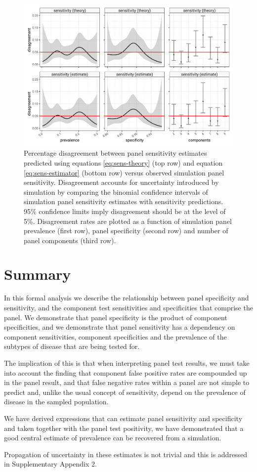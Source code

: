 \documentclass[a4paper, 12pt, twoside]{article}
\let\Oldsection\section
\renewcommand{\section}{\FloatBarrier\Oldsection}
\begin{document}
\begin{figure}[h!]
\centering
  \includegraphics{fig/calibration-prediction-v-simulation.png}
  \caption{Percentage disagreement between panel sensitivity estimates predicted using equations \eqref{eq:sens-theory} (top row) and equation \eqref{eq:sens-estimator} (bottom row) versus observed simulation panel sensitivity. Disagreement accounts for uncertainty introduced by simulation by comparing the binomial confidence intervals of simulation panel sensitivity estimates with sensitivity predictions. 95\% confidence limits imply disagreement should be at the level of 5\%. Disagreement rates are plotted as a function of simulation panel prevalence (first row), panel specificity (second row) and number of panel components (third row).}
\label{fig:A6}
\end{figure}

\section{Summary}

In this formal analysis we describe the relationship between panel specificity and sensitivity, and the component test sensitivities and specificities that comprise the panel. We demonstrate that panel specificity is the product of component specificities, and we demonstrate that panel sensitivity has a dependency on component sensitivities, component specificities and the prevalence of the subtypes of disease that are being tested for.

The implication of this is that when interpreting panel test results, we must take into account the finding that component false positive rates are compounded up in the panel result, and that false negative rates within a panel are not simple to predict and, unlike the usual concept of sensitivity, depend on the prevalence of disease in the sampled population.

We have derived expressions that can estimate panel sensitivity and specificity and taken together with the panel test positivity, we have demonstrated that a good central estimate of prevalence can be recovered from a simulation.

Propagation of uncertainty in these estimates is not trivial and this is addressed in Supplementary Appendix 2.


\end{document}
